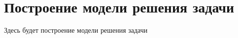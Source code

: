 \renewcommand{\chaptertitle}{Построение модели решения задачи}  %
\chapter{\chaptertitle}\label{ch:ch6}

Здесь будет построение модели решения задачи